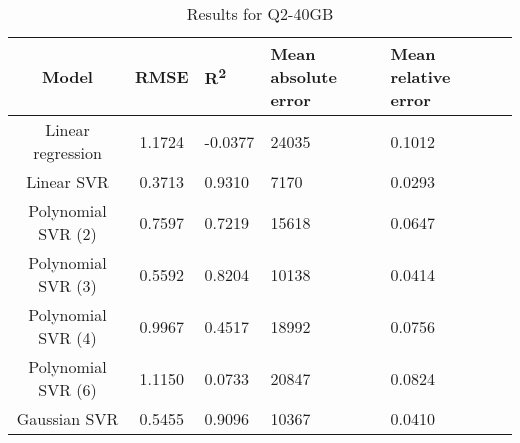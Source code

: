 \begin{table}[H]
\centering
\begin{adjustbox}{center}
\begin{tabular}{c | c M{1.2cm} M{2.5cm} M{2.5cm} M{1.8cm}}
Model & RMSE & R\textsuperscript{2} & Mean absolute error & Mean relative error \tabularnewline
\hline
Linear regression & 1.1724 & -0.0377 &  24035 & 0.1012 \\
Linear SVR & 0.3713 & 0.9310 &   7170 & 0.0293 \\
Polynomial SVR (2) & 0.7597 & 0.7219 &  15618 & 0.0647 \\
Polynomial SVR (3) & 0.5592 & 0.8204 &  10138 & 0.0414 \\
Polynomial SVR (4) & 0.9967 & 0.4517 &  18992 & 0.0756 \\
Polynomial SVR (6) & 1.1150 & 0.0733 &  20847 & 0.0824 \\
Gaussian SVR & 0.5455 & 0.9096 &  10367 & 0.0410 \\
\end{tabular}
\end{adjustbox}
\\
\caption{Results for Q2-40GB}
\label{tab:all_linear_Q2_40}
\end{table}
